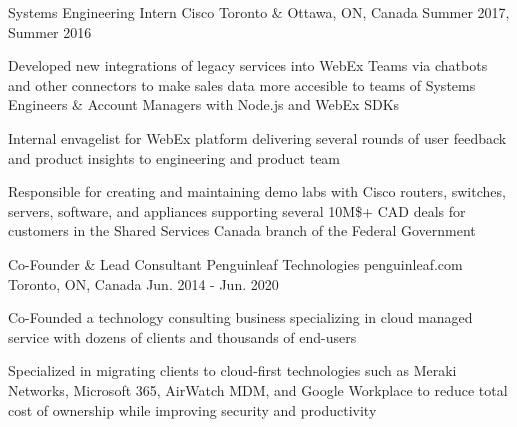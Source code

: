 \begin{cventries}
  \cventry
    {Systems Engineering Intern} %
    {Cisco} %
    {} %
    {Toronto \& Ottawa, ON, Canada} %
    {Summer 2017, Summer 2016} %
    {
      \begin{cvitems} %
        \item {Developed new integrations of legacy services into WebEx Teams via chatbots and other connectors to make sales data more accesible to teams of Systems Engineers \& Account Managers with Node.js and WebEx SDKs}
        \item {Internal envagelist for WebEx platform delivering several rounds of user feedback and product insights to engineering and product team}
        \item {Responsible for creating and maintaining demo labs with Cisco routers, switches, servers, software, and appliances supporting several 10M\$+ CAD deals for customers in the Shared Services Canada branch of the Federal Government}
      \end{cvitems}
    }

  \cventry
    {Co-Founder \& Lead Consultant} %
    {Penguinleaf Technologies} %
    {penguinleaf.com} %
    {Toronto, ON, Canada} %
    {Jun. 2014 - Jun. 2020} %
    {
      \begin{cvitems} %
        \item {Co-Founded a technology consulting business specializing in cloud managed service with dozens of clients and thousands of end-users}
        \item {Specialized in migrating clients to cloud-first technologies such as Meraki Networks, Microsoft 365, AirWatch MDM, and Google Workplace to reduce total cost of ownership while improving security and productivity}
      \end{cvitems}
    }

\end{cventries}
